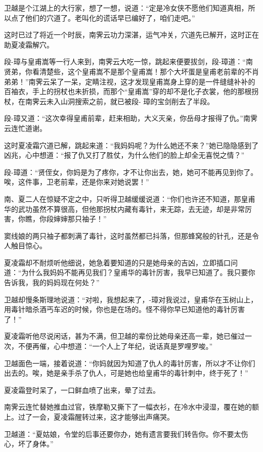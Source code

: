 \documentclass[12pt,oneside]{book}
\begin{document}
卫越是个江湖上的大行家，想了一想，说道：``定是冷女侠不愿他们知道真相，所以点了他们的穴道了。老叫化的谎话早已编好了，咱们走吧。''

这时已过了将近一个时辰，南霁云功力深湛，运气冲关，穴道先已解开，这时正在助夏凌霜解穴。

段-璋与皇甫嵩等一行人来到，南霁云大吃一惊，跳起来便要拔剑，段-璋道：``南贤弟，你看清楚些，这个皇甫嵩不是那个皇甫嵩！那个大坏蛋是皇甫老前辈的不肖弟弟！''南霁云呆了一呆，定睛注视，这才发现皇甫嵩身上穿的是一件缝缝补补的百袖衣，手上的拐杖也未折损，而那个``皇甫嵩''穿的却不是化子衣裳，他的那根拐杖，在南霁云未入山洞搜索之前，就已被段-
璋的宝剑削去了半段。

段-璋又道：``这次幸得皇甫前辈，赶来相助，大义灭亲，你岳母才报得了仇。''南霁云连忙道谢。

这时夏凌霜穴道已解，跳起来道：``我妈妈呢？为什么她还不来？''她已隐隐感到了凶兆，心中想道：``报了仇又打了胜仗，为什么他们的脸上却全无喜悦之情？''

段-璋道：``贤侄女，你妈是为了疼你，才不让你出去，她，她可不能再见到你了。唉，这件事，卫老前辈，还是你来对她说罢！''

南、夏二人在惊疑不定之中，只听得卫越缓缓说道：``你们也许还不知道，那皇甫华的武功虽然不算很高，但他那拐杖内藏有毒针，来无踪，去无迹，却是非常厉害，你瞧，你段婶婶那只袖子！''

窦线娘的两只袖子都刺满了毒针，这时虽然都已抖落，但那蜂窝般的针孔，还是令人触目惊心。

夏凌霜却不耐烦听他细说，她急着要知道的只是她母亲的吉凶，立即插口问道：``为什么我妈妈不能再见我们？皇甫华的毒针厉害，我早已知道了。我只要你告诉我，我的妈妈现在何处？''

卫越却慢条斯理地说道：``对啦，我想起来了，-璋对我说过，皇甫华在玉树山上，用毒针暗杀酒丐车迟的时候，你也是在场的。怪不得你早已知道他的毒针厉害了！''

夏凌霜听他尽说闲话，甚为不满，但卫越的辈份比她母亲还高一辈，她已催过一次，不便再催，心中想道：``一个人上了年纪，说话真是罗哩罗唆。''

卫越面色一端，接着说道：``你妈就因为知道了仇人的毒针厉害，所以才不让你们出去的。唉，她是亲手杀了仇人，可是她也给皇甫华的毒针刺中，终于死了！''

夏凌霜登时呆了，一口鲜血喷了出来，晕了过去。

南霁云连忙替她推血过官，铁摩勒又撕下了一幅衣衫，在冷水中浸湿，覆在她的额上。过了一会，夏凌霜醒转过来，这才能够出声痛哭。

卫越道：``夏姑娘，令堂的后事还要你办，她有遗言要我们转告你。你不要太伤心，坏了身体。''
\end{document}

